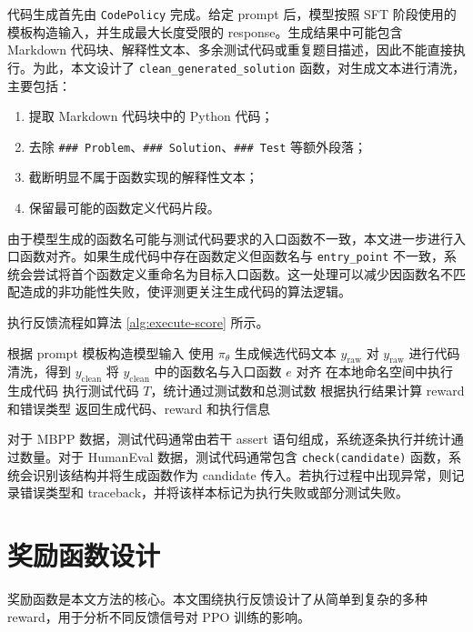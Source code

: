 代码生成首先由 \texttt{CodePolicy} 完成。给定 prompt 后，模型按照 SFT 阶段使用的模板构造输入，并生成最大长度受限的 response。生成结果中可能包含 Markdown 代码块、解释性文本、多余测试代码或重复题目描述，因此不能直接执行。为此，本文设计了 \texttt{clean\_generated\_solution} 函数，对生成文本进行清洗，主要包括：

\begin{enumerate}
  \item 提取 Markdown 代码块中的 Python 代码；
  \item 去除 \texttt{### Problem}、\texttt{### Solution}、\texttt{### Test} 等额外段落；
  \item 截断明显不属于函数实现的解释性文本；
  \item 保留最可能的函数定义代码片段。
\end{enumerate}

由于模型生成的函数名可能与测试代码要求的入口函数不一致，本文进一步进行入口函数对齐。如果生成代码中存在函数定义但函数名与 \texttt{entry\_point} 不一致，系统会尝试将首个函数定义重命名为目标入口函数。这一处理可以减少因函数名不匹配造成的非功能性失败，使评测更关注生成代码的算法逻辑。

执行反馈流程如算法 \ref{alg:execute-score} 所示。

\begin{algorithm}[!htp]
  \caption{代码生成与执行反馈流程}
  \label{alg:execute-score}
  根据 prompt 模板构造模型输入\;
  使用 $\pi_{\theta}$ 生成候选代码文本 $y_{\mathrm{raw}}$\;
  对 $y_{\mathrm{raw}}$ 进行代码清洗，得到 $y_{\mathrm{clean}}$\;
  将 $y_{\mathrm{clean}}$ 中的函数名与入口函数 $e$ 对齐\;
  在本地命名空间中执行生成代码\;
  执行测试代码 $T$，统计通过测试数和总测试数\;
  根据执行结果计算 reward 和错误类型\;
  返回生成代码、reward 和执行信息\;
\end{algorithm}

对于 MBPP 数据，测试代码通常由若干 assert 语句组成，系统逐条执行并统计通过数量。对于 HumanEval 数据，测试代码通常包含 \texttt{check(candidate)} 函数，系统会识别该结构并将生成函数作为 candidate 传入。若执行过程中出现异常，则记录错误类型和 traceback，并将该样本标记为执行失败或部分测试失败。

\section{奖励函数设计}

奖励函数是本文方法的核心。本文围绕执行反馈设计了从简单到复杂的多种 reward，用于分析不同反馈信号对 PPO 训练的影响。


